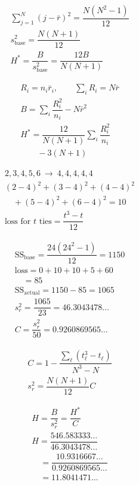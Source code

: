 \[
\begin{gathered}
\sum_{j=1}^{N}(j-\bar r)^2=\dfrac{N(N^2-1)}{12} \\
s_{\mathrm{base}}^2=\dfrac{N(N+1)}{12} \\
H^*=\dfrac{B}{s_{\mathrm{base}}^2}=\dfrac{12B}{N(N+1)}
\end{gathered}
\]

\[
\begin{gathered}
R_i=n_i\bar r_i,\qquad \sum_iR_i=N\bar r \\
B=\sum_i\dfrac{R_i^2}{n_i}-N\bar r^2 \\
H^*=\dfrac{12}{N(N+1)}\sum_i\dfrac{R_i^2}{n_i} \\
\qquad -3(N+1)
\end{gathered}
\]

\[
\begin{gathered}
2,3,4,5,6\ \longrightarrow\ 4,4,4,4,4 \\
(2-4)^2+(3-4)^2+(4-4)^2 \\
\quad+(5-4)^2+(6-4)^2=10 \\
\text{loss for }t\text{ ties}=\dfrac{t^3-t}{12}
\end{gathered}
\]

\[
\begin{gathered}
\mathrm{SS}_{\mathrm{base}}=\dfrac{24(24^2-1)}{12}=1150 \\
\mathrm{loss}=0+10+10+5+60 \\
\quad=85 \\
\mathrm{SS}_{\mathrm{actual}}=1150-85=1065 \\
s_r^2=\dfrac{1065}{23}=46.3043478\ldots \\
C=\dfrac{s_r^2}{50}=0.9260869565\ldots
\end{gathered}
\]

\[
\begin{gathered}
C=1-\dfrac{\sum_\ell(t_\ell^3-t_\ell)}{N^3-N} \\
s_r^2=\dfrac{N(N+1)}{12}C
\end{gathered}
\]

\[
\begin{gathered}
H=\dfrac{B}{s_r^2}=\dfrac{H^*}{C} \\
H=\dfrac{546.583333\ldots}{46.3043478\ldots} \\
\quad=\dfrac{10.9316667\ldots}{0.9260869565\ldots} \\
\quad=11.8041471\ldots
\end{gathered}
\]

